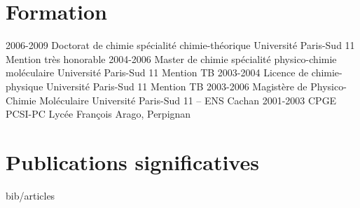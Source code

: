 \documentclass[french]{cv-style}      %
\begin{document}

\section{Formation}

\begin{entrylist}
\entry
{2006-2009}
{Doctorat de chimie {\normalfont spécialité chimie-théorique}}
{Université Paris-Sud 11}
{Mention très honorable}
\entry
{2004-2006}
{Master de chimie {\normalfont spécialité physico-chimie moléculaire}}
{Université Paris-Sud 11}
{Mention TB}
\entry
{2003-2004}
{Licence de chimie-physique}
{Université Paris-Sud 11}
{Mention TB}
\entry
{2003-2006}
{Magistère de Physico-Chimie Moléculaire}
{Université Paris-Sud 11 -- ENS Cachan}
{}
\entry
{2001-2003}
{CPGE {\normalfont PCSI-PC}}
{Lycée François Arago, Perpignan}
{}
\end{entrylist}


\section{Publications significatives}

\nocite{vallverdu2016, guille2015, Guille2014, Martin2012, Maillet2011, Vallverdu2010}
\begin{btSect}{bib/articles}
    \btPrintCited
\end{btSect}


%

\end{document}
